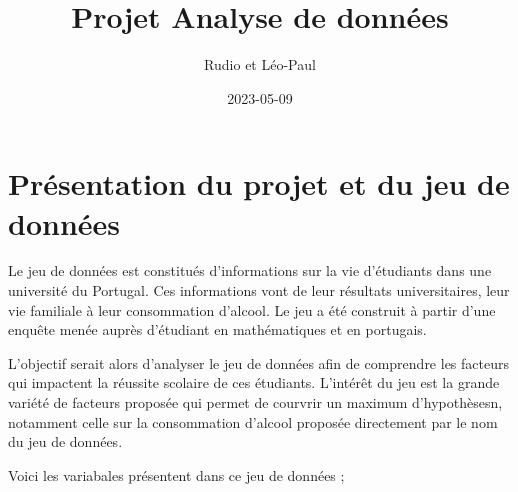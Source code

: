 \documentclass[
]{article}
\title{Projet Analyse de données}
\author{Rudio et Léo-Paul}
\date{2023-05-09}
\begin{document}
\maketitle

\hypertarget{pruxe9sentation-du-projet-et-du-jeu-de-donnuxe9es}{%
\section{Présentation du projet et du jeu de
données}\label{pruxe9sentation-du-projet-et-du-jeu-de-donnuxe9es}}

Le jeu de données est constitués d'informations sur la vie d'étudiants
dans une université du Portugal. Ces informations vont de leur résultats
universitaires, leur vie familiale à leur consommation d'alcool. Le jeu
a été construit à partir d'une enquête menée auprès d'étudiant en
mathématiques et en portugais.

L'objectif serait alors d'analyser le jeu de données afin de comprendre
les facteurs qui impactent la réussite scolaire de ces étudiants.
L'intérêt du jeu est la grande variété de facteurs proposée qui permet
de courvrir un maximum d'hypothèsesn, notamment celle sur la
consommation d'alcool proposée directement par le nom du jeu de données.

Voici les variabales présentent dans ce jeu de données ;
\end{document}

